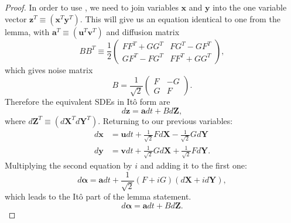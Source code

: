 \begin{proof}
In order to use ,
we need to join variables $\bm{x}$ and $\bm{y}$ into the one variable vector $\bm{z}^T \equiv (\bm{x}^T \bm{y}^T)$.
This will give us an equation identical to one from the lemma,
with $\bm{a}^T \equiv (\bm{u}^T \bm{v}^T)$ and diffusion matrix
\[
	B B^T \equiv \frac{1}{2} \begin{pmatrix}
		F F^T + G G^T & F G^T - G F^T \\
		G F^T - F G^T & F F^T + G G^T
	\end{pmatrix},
\]
which gives noise matrix
\[
	B = \frac{1}{\sqrt{2}} \begin{pmatrix}
		F & -G \\
		G & F
	\end{pmatrix}.
\]
Therefore the equivalent SDEs in It\^{o} form are
\[
	d\bm{z} = \bm{a} dt + B d\bm{Z},
\]
where $d\bm{Z}^T \equiv (d\bm{X}^T d\bm{Y}^T)$.
Returning to our previous variables:
\begin{equation*}
\begin{split}
	d\bm{x} & = \bm{u} dt + \frac{1}{\sqrt{2}} F d\bm{X} - \frac{1}{\sqrt{2}} G d\bm{Y} \\
	d\bm{y} & = \bm{v} dt + \frac{1}{\sqrt{2}} G d\bm{X} + \frac{1}{\sqrt{2}} F d\bm{Y}.
\end{split}
\end{equation*}
Multiplying the second equation by $i$ and adding it to the first one:
\[
	d\bm{\alpha} = \bm{a} dt + \frac{1}{\sqrt{2}} (F + iG) (d\bm{X} + id\bm{Y}),
\]
which leads to the It\^{o} part of the lemma statement.
\[
	d\bm{\alpha} = \bm{a} dt + B d\bm{Z}.
\]


\end{proof}
